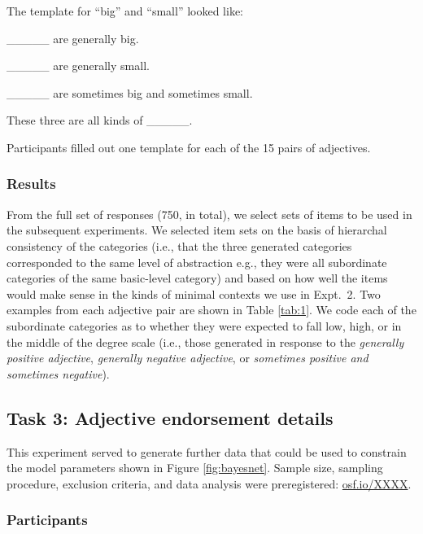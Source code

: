 \documentclass[doc]{apa6}
\begin{document}
The template for ``big'' and ``small'' looked like: 
\begin{description}[noitemsep]
\item \_\_\_\_\_ are generally big.
\item  \_\_\_\_\_ are generally small.
\item \_\_\_\_\_ are sometimes big and sometimes small.
\item These three are all kinds of \_\_\_\_\_.
\end{description}
%
Participants filled out one template for each of the 15 pairs of adjectives. 


\subsubsection{Results}
From the full set of responses (750, in total), we select sets of items to be used in the subsequent experiments. 
We selected item sets on the basis of hierarchal consistency of the categories (i.e., that the three generated categories corresponded to the same level of abstraction e.g., they were all subordinate categories of the same basic-level category) and based on how well the items would make sense in the kinds of minimal contexts we use in Expt.~2. 
Two examples from each adjective pair are shown in Table \ref{tab:1}. 
We code each of the subordinate categories as to whether they were expected to fall low, high, or in the middle of the degree scale (i.e., those generated in response to the \emph{generally positive adjective}, \emph{generally negative adjective}, or \emph{sometimes positive and sometimes negative}). 


\subsection{Task 3: Adjective endorsement details} 

This experiment served to generate further data that could be used to constrain the model parameters shown in Figure \ref{fig:bayesnet}.
Sample size, sampling procedure, exclusion criteria, and data analysis were preregistered: \url{osf.io/XXXX}.

\subsubsection{Participants}
\end{document}

